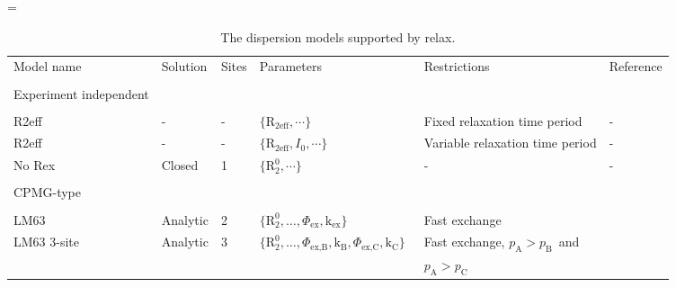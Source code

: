 \documentclass[a4paper,11pt,twoside,openright]{book}
\makeatletter
\let\realnormalsize=\normalsize
\def\liih@math{\ifmmode$\else\bad@math\fi}
\def\adjustnormalsize{\def\normalsize{\mathsurround=0pt \realnormalsize
 \parindent=0pt\abovedisplayskip=0pt\belowdisplayskip=0pt}%
 \def\phantompar{\csname par\endcsname}\normalsize}%
\newcommand\lthtmlvboxmathA{\adjustnormalsize\setbox\sizebox=\vbox\bgroup %
 \let\ifinner=\iffalse \let\)\liih@math }%
\newcommand\lthtmlmathtype[1]{\gdef\lthtmlmathenv{#1}}%
\newcommand\lthtmlfigureA[1]{\let\@savefreelist\@freelist
       \lthtmlmathtype{#1}\lthtmlvboxmathA}%
\makeatother
\begin{document}
\setcounter{footnote}{0}
{\newpage\clearpage
\lthtmlfigureA{landscape9975}%
\begin{landscape}

\begin{center}
\begin{small}
\par
\begin{longtable}{llllll}
\par
\caption[The dispersion models.]{The dispersion models supported by relax.}
\par
\\
\toprule
Model name               & Solution & Sites & Parameters                                          & Restrictions                      & Reference \\
\midrule
\endhead
\par
\bottomrule
\endfoot
\par
\par
\\[-5pt]
Experiment independent \\
\cline{1-1}
\\[-5pt]
R2eff                    & -        & -     & $\{\mathrm{R}_{\textrm{2eff}}, \cdots\}$\                               & Fixed relaxation time period      & - \\
R2eff                    & -        & -     & $\{\mathrm{R}_{\textrm{2eff}}, I_0, \cdots\}$\                          & Variable relaxation time period   & - \\
No Rex                   & Closed   & 1     & $\{\mathrm{R}_2^0, \cdots\}$\                              & -                                 & - \\
\par
\\[-5pt]
CPMG-type \\
\cline{1-1}
\\[-5pt]
LM63                     & Analytic & 2     & $\{\mathrm{R}_2^0, \dots, \Phi_{\textrm{ex}}, \textrm{k}_{\textrm{ex}}\}$\                 & Fast exchange                     & \citet{LuzMeiboom63} \\
LM63 3-site              & Analytic & 3     & $\{\mathrm{R}_2^0, \dots, \Phi_{\textrm{ex,B}}, \textrm{k}_{\textrm{B}}, \Phi_{\textrm{ex,C}}, \textrm{k}_{\textrm{C}}\}$\   & Fast exchange, $p_{\textrm{A}}> p_{\textrm{B}}$\  and    & \citet{LuzMeiboom63} \\
                         &          &       &                                                     & $p_{\textrm{A}}> p_{\textrm{C}}$\  \\

\end{longtable}
\end{small}
\end{center}
\end{landscape}}
\end{document}
